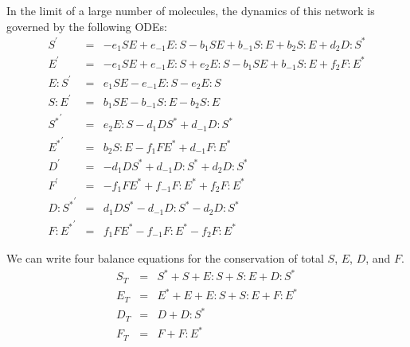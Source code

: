 \documentclass[aip,jcp,preprint]{revtex4-1}
\begin{document}
\begin{widetext}
In the limit of a large number of molecules, the dynamics of this network is governed by the following ODEs:
\begin{equation}
    \begin{array}{rcl}
        S^\prime & = & -e_1 S E + e_{-1} E:S -b_1 S E + b_{-1} S:E + b_2 S:E + d_2 D:S^{*} \\
        E^\prime & = & -e_1 S E + e_{-1} E:S + e_2 E:S - b_1 S E +b_{-1} S:E + f_2 F:E^{*} \\
        E:S^\prime & = & e_1 S E -e_{-1} E:S -e_2 E:S \\
        S:E^\prime & = & b_1 S E -b_{-1} S:E -b_2 S:E \\
        {S^{*}}^\prime & = & e_2 E:S -d_1 D S^{*} + d_{-1} D:S^{*} \\
        {E^{*}}^\prime & = & b_2 S:E -f_1 F E^{*} + d_{-1} F:E^{*} \\
        D^\prime & = & -d_1 D S^{*} + d_{-1} D:S^{*} + d_2 D:S^{*} \\
        F^\prime & = & -f_1 F E^{*} + f_{-1} F:E^{*} + f_2 F:E^{*} \\
        {D:S^{*}}^\prime & = & d_1 D S^{*} - d_{-1} D:S^{*} -d_2 D:S^{*} \\
        {F:E^{*}}^\prime & = & f_1 FE^{*} - f_{-1} F:E^{*} -f_2 F:E^{*}
    \end{array}
\end{equation}
\end{widetext}

We can write four balance equations for the conservation of total $S$, $E$, $D$, and $F$.
\begin{equation}
    \begin{array}{rcl}
        S_T & = & S^{*} + S + E:S + S:E + D:S^{*} \\
        E_T & = & E^{*} + E + E:S + S:E + F:E^{*} \\
        D_T & = & D + D:S^{*} \\
        F_T & = & F + F:E^{*}
    \end{array}
\end{equation}
\end{document}
